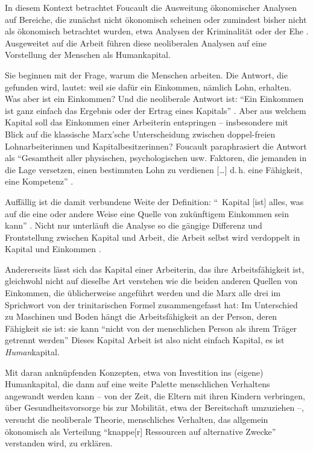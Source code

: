 \documentclass[12pt,
               DIV13,
               paper=a4,
               twoside=false,
               onehalfspacing,
               bibliography=totoc,
               toc=graduated,
               draft,
               ]{scrartcl}
\newcommand{\lips}{\dots\unkern}
\newcommand{\pc}[2]{\parencite[#1]{#2}}
\newcommand{\vgl}[2]{\parencite[vgl.][#1]{#2}}
\begin{document}
In diesem Kontext betrachtet Foucault die Ausweitung ökonomischer
Analysen auf Bereiche, die zunächst nicht ökonomisch scheinen oder
zumindest bisher nicht als ökonomisch betrachtet wurden, etwa Analysen
der Kriminalität oder der Ehe \vgl{367}{gbp}. Ausgeweitet auf 
die Arbeit führen diese neoliberalen Analysen auf eine Vorstellung der
Menschen als Humankapital.

Sie beginnen mit der Frage, warum die Menschen arbeiten. Die Antwort,
die gefunden wird, lautet: weil sie dafür ein Einkommen, nämlich Lohn,
erhalten. Was aber ist ein Einkommen? Und die neoliberale Antwort ist:
"`Ein Einkommen ist ganz einfach das Ergebnis oder der Ertrag eines
Kapitals"' \pc{S. 311 f.}{gbp}. Aber aus welchem Kapital soll das
Einkommen einer Arbeiterin entspringen -- insbesondere mit Blick auf die
klassische Marx'sche Unterscheidung zwischen doppel-freien
Lohnarbeiterinnen und Kapitalbesitzerinnen? Foucault paraphrasiert die
Antwort als "`Gesamtheit aller physischen, psychologischen usw.
Faktoren, die jemanden in die Lage versetzen, einen bestimmten Lohn zu
verdienen [\lips] d.\,h. eine Fähigkeit, eine Kompetenz"' \pc{312}{gbp}.

Auffällig ist die damit verbundene Weite der Definition: "`\,\glq
Kapital\grq{} [ist] alles, was auf die eine oder andere Weise eine
Quelle von zukünftigem Einkommen sein kann"' \pc{312}{gbp}. Nicht nur
unterläuft die Analyse so die gängige Differenz und Frontstellung
zwischen Kapital und Arbeit, die Arbeit selbst wird verdoppelt in
Kapital und Einkommen \vgl{312}{gbp}.

Andererseits lässt sich das Kapital einer Arbeiterin, das ihre
Arbeitsfähigkeit ist, gleichwohl nicht auf dieselbe Art verstehen wie
die beiden anderen Quellen von Einkommen, die üblicherweise angeführt
werden und die Marx alle drei im Sprichwort von der trinitarischen
Formel zusammengefasst hat: Im Unterschied zu Maschinen und Boden
hängt die Arbeitsfähigkeit an der Person, deren Fähigkeit sie ist: sie
kann "`nicht von der menschlichen Person als ihrem Träger getrennt
werden"' \pc{315}. Dieses Kapital Arbeit ist also nicht einfach
Kapital, es ist \emph{Human}kapital.


Mit daran anknüpfenden Konzepten, etwa von Investition ins (eigene)
Humankapital, die dann auf eine weite Palette menschlichen Verhaltens
angewandt werden kann -- von der Zeit, die Eltern mit ihren Kindern
verbringen, über Gesundheitsvorsorge bis zur Mobilität, etwa der
Bereitschaft umzuziehen \vgl{320}{gbp} --, versucht die neoliberale
Theorie, menschliches Verhalten, das allgemein ökonomisch als
Verteilung "`knappe[r] Ressourcen auf alternative Zwecke"'
\pc{310}{gbp} verstanden wird, zu erklären.
\end{document}
